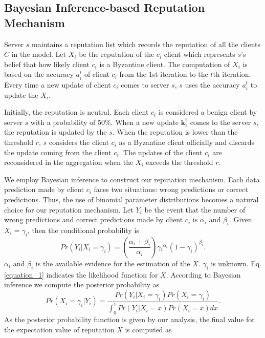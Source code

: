 \documentclass[journal]{IEEEtran}
\begin{document}
\subsection{Bayesian Inference-based Reputation Mechanism}
Server $s$ maintains a reputation list which records the reputation of all the clients $C$ in the model. Let $X_i$ be the reputation of the $c_i$ client which represents $s$'s belief that how likely client $c_i$ is a Byzantine client. The computation of $X_i$ is based on the accuracy $a_i^t$ of client $c_i$ from the 1st iteration to the $t$th iteration. Every time a new update of client $c_i$ comes to server $s$, $s$ uses the accuracy $a_i^t$ to update the $X_i$.
\par Initially, the reputation is neutral. Each client $c_i$ is considered a benign client by server $s$ with a probability of 50\%. When a new update $\mathbf{k_i^t}$ comes to the server $s$, the reputation is updated by the $s$. When the reputation is lower than the threshold $r$, $s$ considers the client $c_i$ as a Byzantine client officially and discards the update coming from the client $c_i$. The updates of the client $c_i$ are reconsidered in the aggregation when the $X_i$ exceeds the threshold $r$.
\par We employ Bayesian inference to construct our reputation mechanism. Each data prediction made by client $c_i$ faces two situations: wrong predictions or correct predictions. Thus, the use of binomial parameter distributions becomes a natural choice for our reputation mechanism. Let $Y_i$ be the event that the number of wrong predictions and correct predictions made by client $c_i$ is $\alpha_i$ and $\beta_i$. Given $X_i=\gamma_i$, then the conditional probability is 
\begin{equation}
    Pr(Y_i|X_i=\gamma _i)=\left ( \frac{\alpha _i+\beta _i}{\alpha _i} \right )\gamma {_{i}}^{\alpha_i}\left ( 1-\gamma_{i} \right )^{\beta_{i}}\label{equation_1}.
\end{equation}
$\alpha_i$ and $\beta_i$ is the available evidence for the estimation of the $X$. $\gamma_i$ is unknown. Eq. \ref{equation_1} indicates the likelihood function for $X$. According to Bayesian inference we compute the posterior probability as
\begin{equation}
    Pr(X_i=\gamma _i|Y_i)=\frac{Pr\left ( Y_{i}|X_{i}=\gamma_{i} \right )Pr(X_{i}=\gamma_{i})}{\int_{0}^{1}Pr\left ( Y_{i}|X_{i}=x \right )Pr(X_{i}=x)dx}\label{equation_2}.
\end{equation}
As the posterior probability function is given by our analysis, the final value for the expectation value of reputation $X$ is computed as
\end{document}
